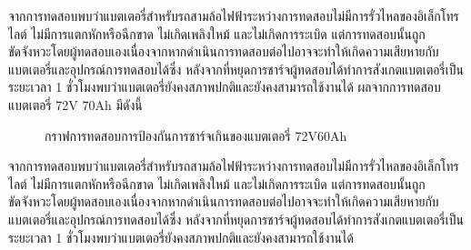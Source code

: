 จากการทดสอบพบว่าแบตเตอรี่สำหรับรถสามล้อไฟฟ้าระหว่างการทดสอบไม่มีการรั่วไหลของอิเล็กโทรไลต์ ไม่มีการแตกหักหรือฉีกขาด ไม่เกิดเพลิงใหม้ และไม่เกิดการระเบิด
แต่การทดสอบนั้นถูกขัดจังหวะโดยผู้ทดสอบเองเนื่องจากหากดำเนินการทดสอบต่อไปอาจจะทำให้เกิดความเสียหายกับแบตเตอรี่และอุปกรณ์การทดสอบได้ซึ่ง
หลังจากที่หยุดการชาร์จผู้ทดสอบได้ทำการสังเกตแบตเตอรี่เป็นระยะเวลา 1 ชั่วโมงพบว่าแบตเตอรี่ยังคงสภาพปกติและยังคงสามารถใช้งานได้
\newline
ผลจากการทดสอบแบตเตอรี่ 72V 70Ah มีดังนี้
\begin{center}
	\begin{figure}[H]
		\centering
		\captionsetup{justification=centering,margin=2cm}
		\caption{กราฟการทดสอบการป้องกันการชาร์จเกินของแบตเตอรี่ 72V60Ah}
	\end{figure}
\end{center}
จากการทดสอบพบว่าแบตเตอรี่สำหรับรถสามล้อไฟฟ้าระหว่างการทดสอบไม่มีการรั่วไหลของอิเล็กโทรไลต์ ไม่มีการแตกหักหรือฉีกขาด ไม่เกิดเพลิงใหม้ และไม่เกิดการระเบิด
แต่การทดสอบนั้นถูกขัดจังหวะโดยผู้ทดสอบเองเนื่องจากหากดำเนินการทดสอบต่อไปอาจจะทำให้เกิดความเสียหายกับแบตเตอรี่และอุปกรณ์การทดสอบได้ซึ่ง
หลังจากที่หยุดการชาร์จผู้ทดสอบได้ทำการสังเกตแบตเตอรี่เป็นระยะเวลา 1 ชั่วโมงพบว่าแบตเตอรี่ยังคงสภาพปกติและยังคงสามารถใช้งานได้
